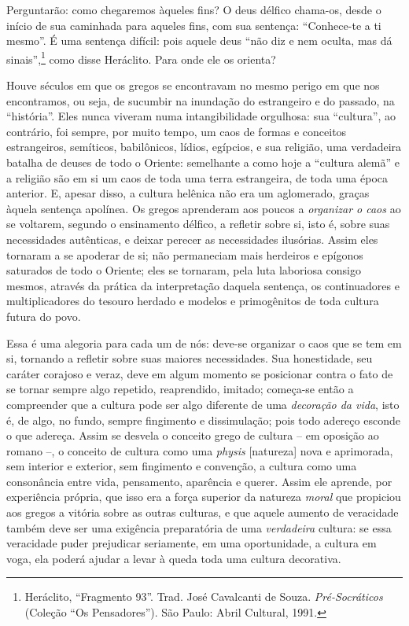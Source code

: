     Perguntarão: como chegaremos àqueles fins? O deus délfico chama-os,
    desde o início de sua caminhada para aqueles fins, com sua sentença:
    ``Conhece-te a ti mesmo''. É uma sentença difícil: pois aquele deus
    ``não diz e nem oculta, mas dá sinais'',\footnote{Heráclito,
      ``Fragmento 93''. Trad. José Cavalcanti de Souza.
      \emph{Pré-Socráticos} (Coleção ``Os Pensadores''). São Paulo:
      Abril Cultural, 1991.} como disse Heráclito. Para onde ele os
    orienta?

    Houve séculos em que os gregos se encontravam no mesmo perigo em que
    nos encontramos, ou seja, de sucumbir na inundação do estrangeiro e
    do passado, na ``história''. Eles nunca viveram numa intangibilidade
    orgulhosa: sua ``cultura'', ao contrário, foi sempre, por muito
    tempo, um caos de formas e conceitos estrangeiros, semíticos,
    babilônicos, lídios, egípcios, e sua religião, uma verdadeira
    batalha de deuses de todo o Oriente: semelhante a como hoje a
    ``cultura alemã'' e a religião são em si um caos de toda uma terra
    estrangeira, de toda uma época anterior. E, apesar disso, a cultura
    helênica não era um aglomerado, graças àquela sentença apolínea. Os
    gregos aprenderam aos poucos a \emph{organizar o caos} ao se
    voltarem, segundo o ensinamento délfico, a refletir sobre si, isto
    é, sobre suas necessidades autênticas, e deixar perecer as
    necessidades ilusórias.\label{necessidadesilusorias} Assim eles tornaram a se apoderar de si; não
    permaneciam mais herdeiros e epígonos saturados de todo o Oriente;
    eles se tornaram, pela luta laboriosa consigo mesmos, através da
    prática da interpretação daquela sentença, os continuadores e
    multiplicadores do tesouro herdado e modelos e primogênitos de toda
    cultura futura do povo.

    Essa é uma alegoria para cada um de nós: deve-se organizar o caos
    que se tem em si, tornando a refletir sobre suas maiores
    necessidades. Sua honestidade, seu caráter corajoso e veraz, deve em
    algum momento se posicionar contra o fato de se tornar sempre algo
    repetido, reaprendido, imitado; começa-se então a compreender que a
    cultura pode ser algo diferente de uma \emph{decoração da vida},
    isto é, de algo, no fundo, sempre fingimento e dissimulação; pois
    todo adereço esconde o que adereça. Assim se desvela o conceito
    grego de cultura -- em oposição ao romano --, o conceito de cultura
    como uma \emph{physis} {[}natureza{]} nova e aprimorada, sem
    interior e exterior, sem fingimento e convenção, a cultura como uma
    consonância entre vida, pensamento, aparência e querer. Assim ele
    aprende, por experiência própria, que isso era a força superior da
    natureza \emph{moral} que propiciou aos gregos a vitória sobre as
    outras culturas, e que aquele aumento de veracidade também deve ser
    uma exigência preparatória de uma \emph{verdadeira} cultura: se essa
    veracidade puder prejudicar seriamente, em uma oportunidade, a
    cultura em voga, ela poderá ajudar a levar à queda toda uma cultura
    decorativa.
